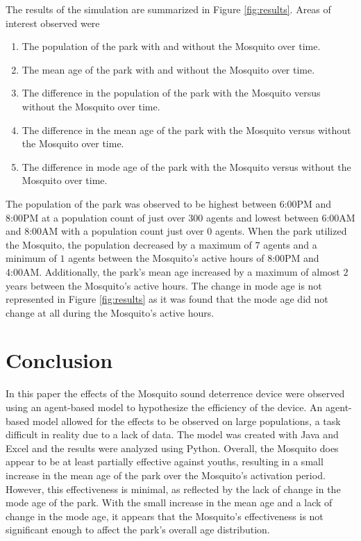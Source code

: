 \documentclass[twocolumn,11pt]{article}
\begin{document}
The results of the simulation are summarized in Figure \ref{fig:results}. Areas of interest observed were 
\begin{enumerate}
    \item The population of the park with and without the Mosquito over time.
    \item The mean age of the park with and without the Mosquito over time.
    \item The difference in the population of the park with the Mosquito versus without the Mosquito over time.
    \item The difference in the mean age of the park with the Mosquito versus without the Mosquito over time.
    \item The difference in mode age of the park with the Mosquito versus without the Mosquito over time.
\end{enumerate}
The population of the park was observed to be highest between 6:00PM and 8:00PM at a population count of just over $300$ agents and lowest between 6:00AM and 8:00AM with a population count just over $0$ agents. When the park utilized the Mosquito, the population decreased by a maximum of $7$ agents and a minimum of $1$ agents between the Mosquito's active hours of 8:00PM and 4:00AM. Additionally, the park's mean age increased by a maximum of almost $2$ years between the Mosquito's active hours. The change in mode age is not represented in Figure \ref{fig:results} as it was found that the mode age did not change at all during the Mosquito's active hours.

\section*{Conclusion}
In this paper the effects of the Mosquito sound deterrence device were observed using an agent-based model to hypothesize the efficiency of the device. An agent-based model allowed for the effects to be observed on large populations, a task difficult in reality due to a lack of data. The model was created with Java and Excel and the results were analyzed using Python. Overall, the Mosquito does appear to be at least partially effective against youths, resulting in a small increase in the mean age of the park over the Mosquito's activation period. However, this effectiveness is minimal, as reflected by the lack of change in the mode age of the park. With the small increase in the mean age and a lack of change in the mode age, it appears that the Mosquito's effectiveness is not significant enough to affect the park's overall age distribution.
\end{document}
